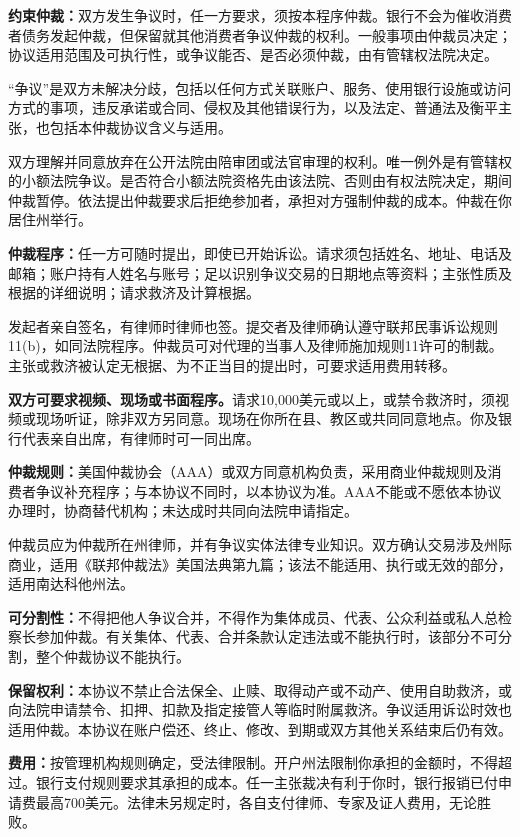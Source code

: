 \documentclass[UTF8,fontset=none,11pt,a4paper]{ctexart}
\begin{document}
\textbf{约束仲裁：}双方发生争议时，任一方要求，须按本程序仲裁。银行不会为催收消费者债务发起仲裁，但保留就其他消费者争议仲裁的权利。一般事项由仲裁员决定；协议适用范围及可执行性，或争议能否、是否必须仲裁，由有管辖权法院决定。


“争议”是双方未解决分歧，包括以任何方式关联账户、服务、使用银行设施或访问方式的事项，违反承诺或合同、侵权及其他错误行为，以及法定、普通法及衡平主张，也包括本仲裁协议含义与适用。


双方理解并同意放弃在公开法院由陪审团或法官审理的权利。唯一例外是有管辖权的小额法院争议。是否符合小额法院资格先由该法院、否则由有权法院决定，期间仲裁暂停。依法提出仲裁要求后拒绝参加者，承担对方强制仲裁的成本。仲裁在你居住州举行。


\textbf{仲裁程序：}任一方可随时提出，即使已开始诉讼。请求须包括姓名、地址、电话及邮箱；账户持有人姓名与账号；足以识别争议交易的日期地点等资料；主张性质及根据的详细说明；请求救济及计算根据。


发起者亲自签名，有律师时律师也签。提交者及律师确认遵守联邦民事诉讼规则11(b)，如同法院程序。仲裁员可对代理的当事人及律师施加规则11许可的制裁。主张或救济被认定无根据、为不正当目的提出时，可要求适用费用转移。


\textbf{双方可要求视频、现场或书面程序。}请求10,000美元或以上，或禁令救济时，须视频或现场听证，除非双方另同意。现场在你所在县、教区或共同同意地点。你及银行代表亲自出席，有律师时可一同出席。


\textbf{仲裁规则：}美国仲裁协会（AAA）或双方同意机构负责，采用商业仲裁规则及消费者争议补充程序；与本协议不同时，以本协议为准。AAA不能或不愿依本协议办理时，协商替代机构；未达成时共同向法院申请指定。


仲裁员应为仲裁所在州律师，并有争议实体法律专业知识。双方确认交易涉及州际商业，适用《联邦仲裁法》美国法典第九篇；该法不能适用、执行或无效的部分，适用南达科他州法。


\textbf{可分割性：}不得把他人争议合并，不得作为集体成员、代表、公众利益或私人总检察长参加仲裁。有关集体、代表、合并条款认定违法或不能执行时，该部分不可分割，整个仲裁协议不能执行。


\textbf{保留权利：}本协议不禁止合法保全、止赎、取得动产或不动产、使用自助救济，或向法院申请禁令、扣押、扣款及指定接管人等临时附属救济。争议适用诉讼时效也适用仲裁。本协议在账户偿还、终止、修改、到期或双方其他关系结束后仍有效。


\textbf{费用：}按管理机构规则确定，受法律限制。开户州法限制你承担的金额时，不得超过。银行支付规则要求其承担的成本。任一主张裁决有利于你时，银行报销已付申请费最高700美元。法律未另规定时，各自支付律师、专家及证人费用，无论胜败。
\end{document}
